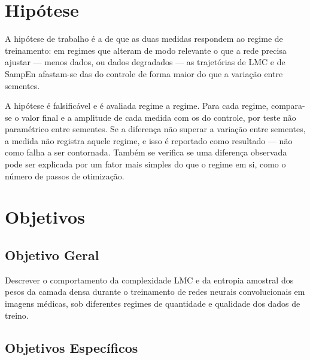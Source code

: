 \section{Hipótese}
\label{sec:P-hipotese}

A hipótese de trabalho é a de que as duas medidas respondem ao regime de
treinamento: em regimes que alteram de modo relevante o que a rede precisa
ajustar --- menos dados, ou dados degradados --- as trajetórias de LMC e de
SampEn afastam-se das do controle de forma maior do que a variação entre
sementes.

A hipótese é falsificável e é avaliada regime a regime. Para cada regime,
compara-se o valor final e a amplitude de cada medida com os do controle, por
teste não paramétrico entre sementes. Se a diferença não superar a variação
entre sementes, a medida não registra aquele regime, e isso é reportado como
resultado --- não como falha a ser contornada. Também se verifica se uma
diferença observada pode ser explicada por um fator mais simples do que o
regime em si, como o número de passos de otimização.

\section{Objetivos}
\label{sec:P-objetivos}

\subsection{Objetivo Geral}

Descrever o comportamento da complexidade LMC e da entropia amostral dos pesos
da camada densa durante o treinamento de redes neurais convolucionais em
imagens médicas, sob diferentes regimes de quantidade e qualidade dos dados de
treino.

\subsection{Objetivos Específicos}

